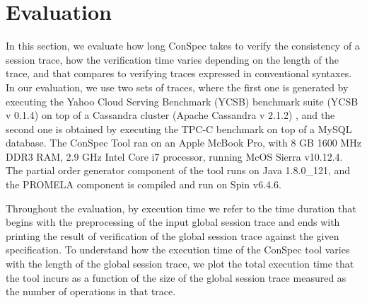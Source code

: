 \documentclass[journal,compsoc]{IEEEtran}
\begin{document}
 \section{Evaluation}\label{sec:eval}
In this section, we evaluate how long ConSpec takes to verify the consistency of a  session trace, how the verification time varies depending on the length of the trace, and that compares to verifying traces expressed in conventional syntaxes. In our evaluation, we use two sets of traces, where the first one is generated by executing the Yahoo Cloud Serving Benchmark (YCSB) benchmark suite (YCSB v 0.1.4)  \cite{Cooper:2010:BCS:1807128.1807152}   on top of a Cassandra cluster (Apache Cassandra v 2.1.2)  \cite{Lakshman:2010:CDS:1773912.1773922}, and the second one is obtained by executing the TPC-C benchmark on top of a MySQL database. 
 The ConSpec Tool ran on an Apple McBook Pro, with 8 GB 1600 MHz DDR3 RAM,  2.9 GHz Intel Core i7 processor, %
 running McOS Sierra v10.12.4. The partial order generator component of the tool runs on Java 1.8.0\_121, and the PROMELA component is compiled and run on Spin v6.4.6.  
  \par Throughout the evaluation, by execution time we refer to the time duration that begins with the preprocessing of the input global session trace and ends with printing the result of verification of the global session trace against the given specification. To understand how the execution time of the ConSpec tool varies with the length of  the global session trace, we plot the total execution time that the tool incurs as a function of the size of the global session trace measured as the number of operations in that trace.
  
\end{document}
